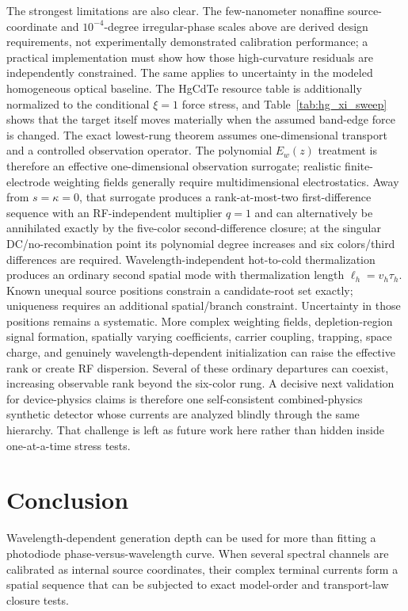 \documentclass[11pt]{article}
\begin{document}
The strongest limitations are also clear. The few-nanometer nonaffine source-coordinate and $10^{-4}$-degree irregular-phase scales above are derived design requirements, not experimentally demonstrated calibration performance; a practical implementation must show how those high-curvature residuals are independently constrained. The same applies to uncertainty in the modeled homogeneous optical baseline. The HgCdTe resource table is additionally normalized to the conditional $\xi=1$ force stress, and Table~\ref{tab:hg_xi_sweep} shows that the target itself moves materially when the assumed band-edge force is changed. The exact lowest-rung theorem assumes one-dimensional transport and a controlled observation operator. The polynomial $E_w(z)$ treatment is therefore an effective one-dimensional observation surrogate; realistic finite-electrode weighting fields generally require multidimensional electrostatics. Away from $s=\kappa=0$, that surrogate produces a rank-at-most-two first-difference sequence with an RF-independent multiplier $q=1$ and can alternatively be annihilated exactly by the five-color second-difference closure; at the singular DC/no-recombination point its polynomial degree increases and six colors/third differences are required. Wavelength-independent hot-to-cold thermalization produces an ordinary second spatial mode with thermalization length $\ell_h=v_h\tau_h$. Known unequal source positions constrain a candidate-root set exactly; uniqueness requires an additional spatial/branch constraint. Uncertainty in those positions remains a systematic. More complex weighting fields, depletion-region signal formation, spatially varying coefficients, carrier coupling, trapping, space charge, and genuinely wavelength-dependent initialization can raise the effective rank or create RF dispersion. Several of these ordinary departures can coexist, increasing observable rank beyond the six-color rung. A decisive next validation for device-physics claims is therefore one self-consistent combined-physics synthetic detector whose currents are analyzed blindly through the same hierarchy. That challenge is left as future work here rather than hidden inside one-at-a-time stress tests.

\section{Conclusion}

Wavelength-dependent generation depth can be used for more than fitting a photodiode phase-versus-wavelength curve. When several spectral channels are calibrated as internal source coordinates, their complex terminal currents form a spatial sequence that can be subjected to exact model-order and transport-law closure tests.
\end{document}

